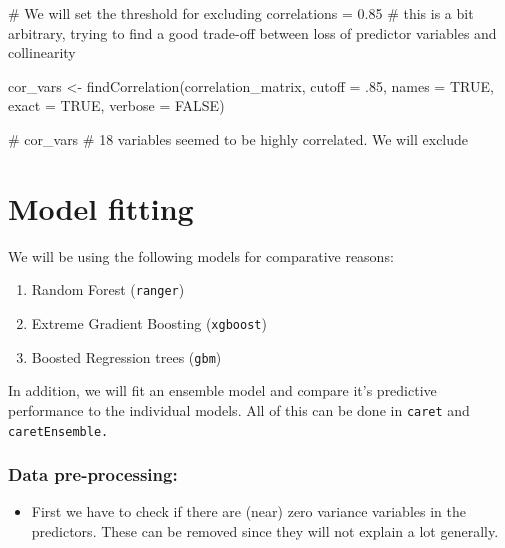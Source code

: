 \documentclass[
  letterpaper,
  DIV=11,
  numbers=noendperiod]{scrreprt}
\newenvironment{Shaded}{\begin{snugshade}}{\end{snugshade}}
\newcommand{\AttributeTok}[1]{\textcolor[rgb]{0.40,0.45,0.13}{#1}}
\newcommand{\CommentTok}[1]{\textcolor[rgb]{0.37,0.37,0.37}{#1}}
\newcommand{\ConstantTok}[1]{\textcolor[rgb]{0.56,0.35,0.01}{#1}}
\newcommand{\DecValTok}[1]{\textcolor[rgb]{0.68,0.00,0.00}{#1}}
\newcommand{\FunctionTok}[1]{\textcolor[rgb]{0.28,0.35,0.67}{#1}}
\newcommand{\NormalTok}[1]{\textcolor[rgb]{0.00,0.23,0.31}{#1}}
\newcommand{\OtherTok}[1]{\textcolor[rgb]{0.00,0.23,0.31}{#1}}
\providecommand{\tightlist}{%
  \setlength{\itemsep}{0pt}\setlength{\parskip}{0pt}}\usepackage{longtable,booktabs,array}
\begin{document}
\begin{Shaded}
\begin{Highlighting}[]
\CommentTok{\# We will set the threshold for excluding correlations = 0.85}
\CommentTok{\# this is a bit arbitrary, trying to find a good trade{-}off between loss of predictor variables and collinearity}

\NormalTok{cor\_vars }\OtherTok{\textless{}{-}} \FunctionTok{findCorrelation}\NormalTok{(correlation\_matrix,}
    \AttributeTok{cutoff =}\NormalTok{ .}\DecValTok{85}\NormalTok{,}
    \AttributeTok{names =} \ConstantTok{TRUE}\NormalTok{,}
    \AttributeTok{exact =} \ConstantTok{TRUE}\NormalTok{,}
    \AttributeTok{verbose =} \ConstantTok{FALSE}\NormalTok{)}

\CommentTok{\# cor\_vars \# 18 variables seemed to be highly correlated. We will exclude}
\end{Highlighting}
\end{Shaded}


\chapter{Model fitting}\label{model-fitting}

We will be using the following models for comparative reasons:

\begin{enumerate}
\def\labelenumi{\arabic{enumi}.}
\tightlist
\item
  Random Forest (\texttt{ranger})
\item
  Extreme Gradient Boosting (\texttt{xgboost})
\item
  Boosted Regression trees (\texttt{gbm})
\end{enumerate}

In addition, we will fit an ensemble model and compare it's predictive
performance to the individual models. All of this can be done in
\texttt{caret} and \texttt{caretEnsemble.}

\subsection{Data pre-processing:}\label{data-pre-processing}

\begin{itemize}
\tightlist
\item
  First we have to check if there are (near) zero variance variables in
  the predictors. These can be removed since they will not explain a lot
  generally.
\end{itemize}
\end{document}
